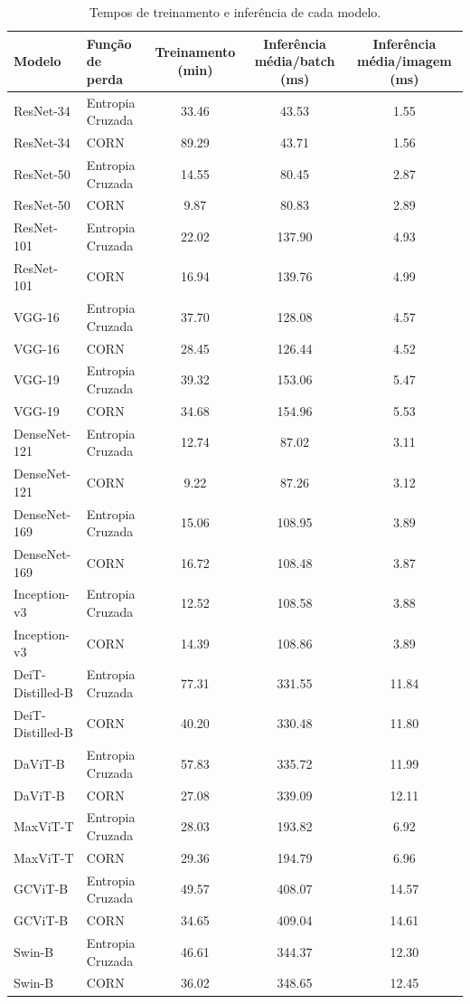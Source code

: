 \begin{table}
    \centering
    \begin{tabular}{llccc}
        \toprule
        \textbf{Modelo} & \textbf{Função de perda} & \textbf{Treinamento (min)} & \textbf{Inferência média/batch (ms)} & \textbf{Inferência média/imagem (ms)} \\
        \midrule
        ResNet-34 & Entropia Cruzada & 33.46 & 43.53 & 1.55 \\
        ResNet-34 & CORN & 89.29 & 43.71 & 1.56 \\
        ResNet-50 & Entropia Cruzada & 14.55 & 80.45 & 2.87 \\
        ResNet-50 & CORN & 9.87 & 80.83 & 2.89 \\
        ResNet-101 & Entropia Cruzada & 22.02 & 137.90 & 4.93 \\
        ResNet-101 & CORN & 16.94 & 139.76 & 4.99 \\
        VGG-16 & Entropia Cruzada & 37.70 & 128.08 & 4.57 \\
        VGG-16 & CORN & 28.45 & 126.44 & 4.52 \\
        VGG-19 & Entropia Cruzada & 39.32 & 153.06 & 5.47 \\
        VGG-19 & CORN & 34.68 & 154.96 & 5.53 \\
        DenseNet-121 & Entropia Cruzada & 12.74 & 87.02 & 3.11 \\
        DenseNet-121 & CORN & 9.22 & 87.26 & 3.12 \\
        DenseNet-169 & Entropia Cruzada & 15.06 & 108.95 & 3.89 \\
        DenseNet-169 & CORN & 16.72 & 108.48 & 3.87 \\
        Inception-v3 & Entropia Cruzada & 12.52 & 108.58 & 3.88 \\
        Inception-v3 & CORN & 14.39 & 108.86 & 3.89 \\
        DeiT-Distilled-B & Entropia Cruzada & 77.31 & 331.55 & 11.84 \\
        DeiT-Distilled-B & CORN & 40.20 & 330.48 & 11.80 \\
        DaViT-B & Entropia Cruzada & 57.83 & 335.72 & 11.99 \\
        DaViT-B & CORN & 27.08 & 339.09 & 12.11 \\
        MaxViT-T & Entropia Cruzada & 28.03 & 193.82 & 6.92 \\
        MaxViT-T & CORN & 29.36 & 194.79 & 6.96 \\
        GCViT-B & Entropia Cruzada & 49.57 & 408.07 & 14.57 \\
        GCViT-B & CORN & 34.65 & 409.04 & 14.61 \\
        Swin-B & Entropia Cruzada & 46.61 & 344.37 & 12.30 \\
        Swin-B & CORN & 36.02 & 348.65 & 12.45 \\
        \bottomrule
    \end{tabular}
    \caption{Tempos de treinamento e inferência de cada modelo.}
    \label{tab:computational_performance}
\end{table}


